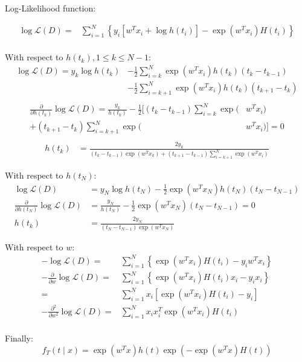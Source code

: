 \documentclass[]{article}
\begin{document}
Log-Likelihood function:

\begin{equation*}
\begin{split}
\log\mathcal{L}(D)
=&\sum_{i=1}^{N}\left\lbrace y_i\left[w^Tx_i + \log h(t_i)\right]-\exp(w^Tx_i)H(t_i)\right\rbrace\\
\end{split}
\end{equation*}

With respect to $h(t_k), 1\le k\le N-1$:
\begin{align*}
\log\mathcal{L}(D)=y_k\log h(t_k)&-\frac{1}{2}\sum_{i=k}^{N}\exp(w^Tx_i)h(t_k)(t_k-t_{k-1})\\
&-\frac{1}{2}\sum_{i=k+1}^{N}\exp(w^Tx_i)h(t_k)(t_{k+1}-t_k)\\
\end{align*}
\begin{align*}
\frac{\partial}{\partial h(t_k)}\log\mathcal{L}(D)=\frac{y_k}{h(t_k)}-\frac{1}{2}\Big[(t_k-t_{k-1})\sum_{i=k}^{N}\exp(& w^Tx_i)\\
+(t_{k+1}-t_k)\sum_{i=k+1}^{N}\exp(& w^Tx_i)\Big]=0\\
\end{align*}
\begin{align*}
h(t_k)&=\frac{2 y_k}{(t_{k}-t_{k-1})\exp(w^Tx_k)+(t_{k+1}-t_{k-1})\sum_{i=k+1}^{N}\exp(w^Tx_i)}
\end{align*}

With respect to $h(t_N)$:
\begin{align*}
\log\mathcal{L}(D)&=y_N\log h(t_N)-\frac{1}{2}\exp(w^Tx_N)h(t_N)(t_N-t_{N-1})\\
\frac{\partial}{\partial h(t_N)}\log\mathcal{L}(D)&=\frac{y_N}{h(t_N)}-\frac{1}{2}\exp(w^Tx_N)(t_N-t_{N-1})=0\\
h(t_k)&=\frac{2 y_N}{(t_{N}-t_{N-1})\exp(w^Tx_N)}
\end{align*}

With respect to $w$:
\begin{equation*}
\begin{split}
-\log\mathcal{L}(D)
=&\sum_{i=1}^{N}\left\lbrace\exp(w^Tx_i)H(t_i)-y_iw^Tx_i\right\rbrace\\
-\frac{\partial}{\partial w}\log\mathcal{L}(D)=&\sum_{i=1}^{N}\left\lbrace\exp(w^Tx_i)H(t_i)x_i-y_ix_i\right\rbrace\\
=&\sum_{i=1}^{N}x_i\left[\exp(w^Tx_i)H(t_i)-y_i\right]\\
-\frac{\partial^2}{\partial w^2}\log\mathcal{L}(D)=&\sum_{i=1}^{N}x_ix_i^T\exp(w^Tx_i)H(t_i)\\
\end{split}
\end{equation*}

Finally:
\[f_T(t\mid x)=\exp(w^Tx)h(t)\exp(-\exp(w^Tx)H(t))\]
\end{document}
